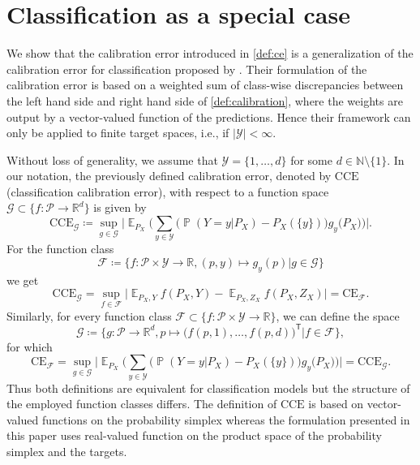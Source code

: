 \documentclass{article}
\DeclareMathOperator{\Prob}{\mathbb{P}}
\DeclareMathOperator{\Exp}{\mathbb{E}}
\begin{document}
\section{Classification as a special case}
\label{app:classification}

We show that the calibration error introduced in
\cref{def:ce} is a generalization of the calibration error
for classification proposed by \citet{Widmann2019}.
Their formulation of the calibration error is based on
a weighted sum of class-wise discrepancies between the
left hand side and right hand side of \cref{def:calibration},
where the weights are output by a vector-valued function
of the predictions. Hence their framework can only be applied to
finite target spaces, i.e., if $|\mathcal{Y}| < \infty$.

Without loss of generality, we assume that
$\mathcal{Y} = \{1, \ldots, d\}$ for some
$d \in \mathbb{N} \setminus \{1\}$. In our notation, the
previously defined calibration error, denoted by
$\mathrm{CCE}$ (classification calibration error), with
respect to a function space
$\mathcal{G} \subset \{f \colon \mathcal{P} \to \mathbb{R}^d\}$
is given by
\begin{equation*}
    \mathrm{CCE}_{\mathcal{G}} \coloneqq \sup_{g \in \mathcal{G}} \bigg| \Exp_{P_X}\bigg(\sum_{y \in \mathcal{Y}} \big(\Prob(Y = y| P_X) - P_X(\{y\})\big) g_y\big(P_X\big) \bigg) \bigg|.
\end{equation*}
For the function class
\begin{equation*}
    \mathcal{F} \coloneqq \big\{f \colon \mathcal{P} \times \mathcal{Y} \to \mathbb{R}, (p, y) \mapsto g_y(p) \big| g \in \mathcal{G}\big\}
\end{equation*}
we get
\begin{equation*}
    \mathrm{CCE}_{\mathcal{G}}
    = \sup_{f \in \mathcal{F}} \big| \Exp_{P_X,Y} f(P_X, Y) - \Exp_{P_X,Z_X} f(P_X, Z_X)\big|
    = \mathrm{CE}_{\mathcal{F}}.
\end{equation*}
Similarly, for every function class
$\mathcal{F} \subset \{f \colon \mathcal{P} \times \mathcal{Y} \to \mathbb{R}\}$,
we can define the space
\begin{equation*}
    \mathcal{G} \coloneqq \Big\{g \colon \mathcal{P} \to \mathbb{R}^d,
    p \mapsto {\big(f(p, 1), \ldots, f(p, d)\big)^\mathsf{T}} \Big| f \in \mathcal{F} \Big\},
\end{equation*}
for which
\begin{equation*}
    \mathrm{CE}_{\mathcal{F}}
    = \sup_{g \in \mathcal{G}} \bigg| \Exp_{P_X}\bigg(\sum_{y \in \mathcal{Y}} \big(\Prob(Y = y| P_X) - P_X(\{y\})\big) g_y\big(P_X\big) \bigg) \bigg|
    = \mathrm{CCE}_{\mathcal{G}}.
\end{equation*}
Thus both definitions are equivalent for classification models but
the structure of the employed function classes differs. The
definition of $\mathrm{CCE}$ is based on vector-valued functions on
the probability simplex whereas the formulation presented in this paper uses
real-valued function on the product space of the probability simplex and
the targets.
\end{document}
